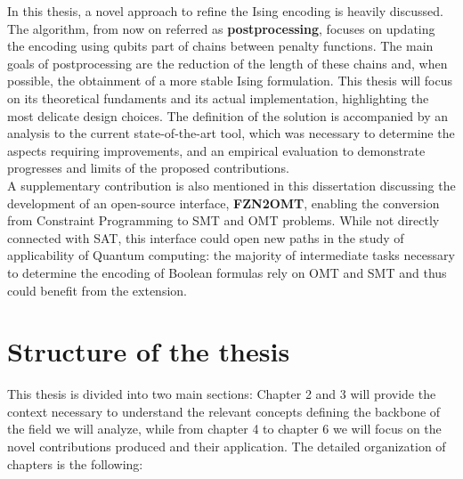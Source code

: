 In this thesis, a novel approach to refine the Ising encoding is heavily discussed. The algorithm, from now on referred as \textbf{postprocessing}, focuses on updating the encoding using qubits part of chains between penalty functions. The main goals of postprocessing are the reduction of the length of these chains and, when possible, the obtainment of a more stable Ising formulation. This thesis will focus on its theoretical fundaments and its actual implementation, highlighting the most delicate design choices.  The definition of the solution is accompanied by an analysis to the current state-of-the-art tool, which was necessary to determine the aspects requiring improvements, and an empirical evaluation to demonstrate progresses and limits of the proposed contributions. \\
A supplementary contribution is also mentioned in this dissertation discussing the development of an open-source interface, \textbf{FZN2OMT}, enabling the conversion from Constraint Programming to SMT and OMT problems. While not directly connected with SAT, this interface could open new paths in the study of applicability of Quantum computing: the majority of intermediate tasks necessary to determine the encoding of Boolean formulas rely on OMT and SMT and thus could benefit from the extension.

\newpage

\section{Structure of the thesis}

This thesis is divided into two main sections: Chapter 2 and 3 will provide the context necessary to understand the relevant concepts defining the backbone of the field we will analyze, while from chapter 4 to chapter 6 we will focus on the novel contributions produced and their application. The detailed organization of chapters is the following:

